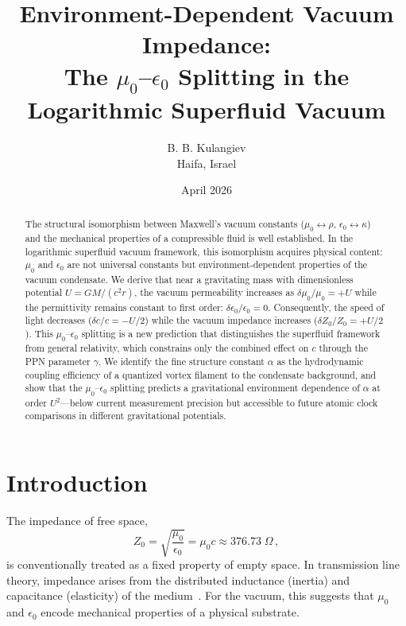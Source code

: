 \documentclass[12pt, a4paper]{article}
\begin{document}
\title{Environment-Dependent Vacuum Impedance:\\
The $\mu_0$--$\epsilon_0$ Splitting in the
Logarithmic Superfluid Vacuum}

\author{B. B. Kulangiev\\\small{Haifa, Israel}}
\date{April 2026}
\maketitle

\begin{abstract}
\noindent
The structural isomorphism between Maxwell's vacuum
constants ($\mu_0 \leftrightarrow \rho$,
$\epsilon_0 \leftrightarrow \kappa$) and the
mechanical properties of a compressible fluid is
well established. In the logarithmic superfluid
vacuum framework, this isomorphism acquires physical
content: $\mu_0$ and $\epsilon_0$ are not universal
constants but environment-dependent properties of the
vacuum condensate. We derive that near a gravitating
mass with dimensionless potential $U = GM/(c^2 r)$,
the vacuum permeability increases as
$\delta\mu_0/\mu_0 = +U$ while the permittivity
remains constant to first order:
$\delta\epsilon_0/\epsilon_0 = 0$. Consequently, the
speed of light decreases ($\delta c/c = -U/2$) while
the vacuum impedance increases
($\delta Z_0/Z_0 = +U/2$). This
$\mu_0$--$\epsilon_0$ splitting is a new prediction
that distinguishes the superfluid framework from
general relativity, which constrains only the
combined effect on $c$ through the PPN parameter
$\gamma$. We identify the fine structure constant
$\alpha$ as the hydrodynamic coupling efficiency of
a quantized vortex filament to the condensate
background, and show that the $\mu_0$--$\epsilon_0$
splitting predicts a gravitational environment
dependence of $\alpha$ at order $U^2$---below current
measurement precision but accessible to future
atomic clock comparisons in different gravitational
potentials.
\end{abstract}


\section{Introduction}
\label{sec:intro}

The impedance of free space,
\begin{equation}
    Z_0 = \sqrt{\frac{\mu_0}{\epsilon_0}}
    = \mu_0 c \approx 376.73\;\Omega\,,
\label{eq:Z0}
\end{equation}
is conventionally treated as a fixed property of
empty space. In transmission line theory, impedance
arises from the distributed inductance (inertia)
and capacitance (elasticity) of the
medium~\cite{jackson_1999}. For the vacuum, this
suggests that $\mu_0$ and $\epsilon_0$ encode
mechanical properties of a physical substrate.
\end{document}
